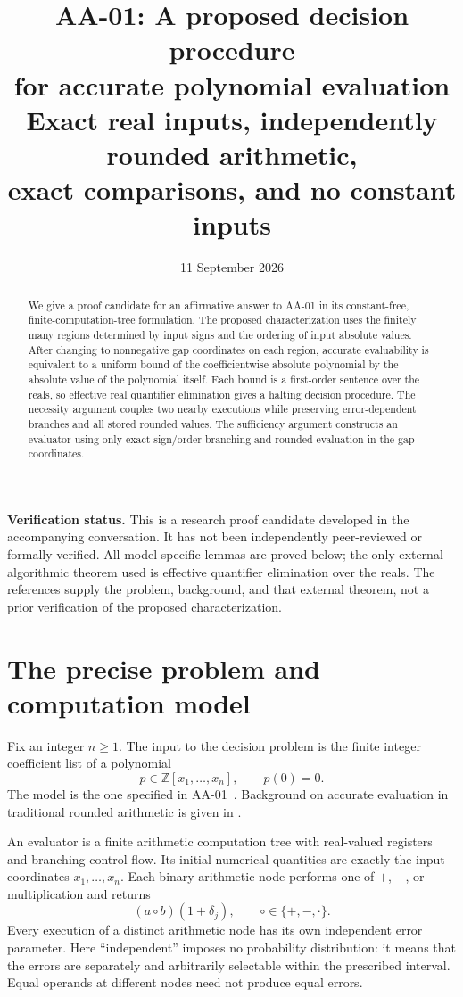 \documentclass[11pt,a4paper]{article}
\title{\textbf{AA-01: A proposed decision procedure\\
for accurate polynomial evaluation}\\[0.5em]
\large Exact real inputs, independently rounded arithmetic,\\
exact comparisons, and no constant inputs}
\author{}
\date{11 September 2026}
\numberwithin{equation}{section}
\theoremstyle{definition}
\theoremstyle{remark}
\newcommand{\Z}{\mathbb Z}
\begin{document}
\maketitle
\thispagestyle{plain}

\begin{abstract}
We give a proof candidate for an affirmative answer to AA-01 in its
constant-free, finite-computation-tree formulation.  The proposed
characterization uses the finitely many regions determined by input signs
and the ordering of input absolute values.  After changing to nonnegative
gap coordinates on each region, accurate evaluability is equivalent to a
uniform bound of the coefficientwise absolute polynomial by the absolute
value of the polynomial itself.  Each bound is a first-order sentence over
the reals, so effective real quantifier elimination gives a halting
decision procedure.  The necessity argument couples two nearby executions
while preserving error-dependent branches and all stored rounded values.
The sufficiency argument constructs an evaluator using only exact
sign/order branching and rounded evaluation in the gap coordinates.
\end{abstract}

\noindent\textbf{Verification status.}
This is a research proof candidate developed in the accompanying
conversation.  It has not been independently peer-reviewed or formally
verified.  All model-specific lemmas are proved below; the only external
algorithmic theorem used is effective quantifier elimination over the
reals.  The references supply the problem, background, and that external
theorem, not a prior verification of the proposed characterization.

\section{The precise problem and computation model}\label{sec:model}

Fix an integer $n\ge1$.  The input to the decision problem is the finite
integer coefficient list of a polynomial
\[
 p\in\Z[x_1,\ldots,x_n],\qquad p(0)=0.
\]
The model is the one specified in AA-01~\cite{AA01}.  Background on accurate
evaluation in traditional rounded arithmetic is given in
\cite{DDH06,DDHK08}.

An evaluator is a finite arithmetic computation tree with real-valued
registers and branching control flow.  Its initial numerical quantities
are exactly the input coordinates $x_1,\ldots,x_n$.  Each binary arithmetic
node performs one of $+$, $-$, or multiplication and returns
\begin{equation}\label{eq:rounding}
 (a\circ b)(1+\delta_j),\qquad \circ\in\{+,-,\cdot\}.
\end{equation}
Every execution of a distinct arithmetic node has its own independent
error parameter.  Here ``independent'' imposes no probability distribution:
it means that the errors are separately and arbitrarily selectable within
the prescribed interval.  Equal operands at different nodes need not
produce equal errors.
\end{document}
